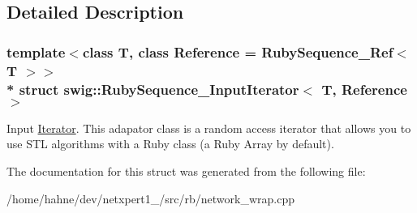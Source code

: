 \subsection{Detailed Description}
\subsubsection*{template$<$class T, class Reference = Ruby\+Sequence\+\_\+\+Ref$<$ T $>$$>$\\*
struct swig\+::\+Ruby\+Sequence\+\_\+\+Input\+Iterator$<$ T, Reference $>$}

Input \hyperlink{structswig_1_1Iterator}{Iterator}. This adapator class is a random access iterator that allows you to use S\+TL algorithms with a Ruby class (a Ruby Array by default). 

The documentation for this struct was generated from the following file\+:\begin{DoxyCompactItemize}
\item 
/home/hahne/dev/netxpert1\+\_/src/rb/network\+\_\+wrap.\+cpp\end{DoxyCompactItemize}
